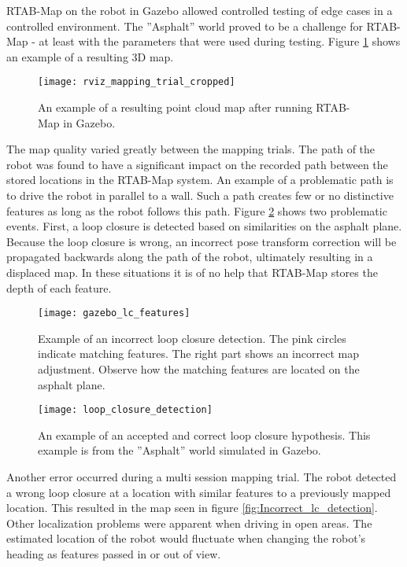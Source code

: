 \ac{RTAB-Map} on the robot in Gazebo allowed controlled testing of edge cases in a controlled environment. The ''Asphalt'' world proved to be a challenge for \ac{RTAB-Map} - at least with the parameters that were used during testing. Figure \ref{fig:rviz_mapping_trial} shows an example of a resulting 3D map. 

\begin{figure}[H]
	\centering
	\texttt{[image: rviz\_mapping\_trial\_cropped]}
	\caption{An example of a resulting point cloud map after running \ac{RTAB-Map} in Gazebo. }
	\label{fig:rviz_mapping_trial}
\end{figure}

The map quality varied greatly between the mapping trials. The path of the robot was found to have a significant impact on the recorded path between the stored locations in the \ac{RTAB-Map} system. An example of a problematic path is to drive the robot in parallel to a wall. Such a path creates few or no distinctive features as long as the robot follows this path. Figure \ref{fig:gazebo_lc_features} shows two problematic events. First, a loop closure is detected based on similarities on the asphalt plane. Because the loop closure is wrong, an incorrect pose transform correction will be propagated backwards along the path of the robot, ultimately resulting in a displaced map. In these situations it is of no help that \ac{RTAB-Map} stores the depth of each feature.

\begin{figure}[h]
	\centering
	\texttt{[image: gazebo\_lc\_features]}
	\caption{Example of an incorrect loop closure detection. The pink circles indicate matching features. The right part shows an incorrect map adjustment. Observe how the matching features are located on the asphalt plane.}
	\label{fig:gazebo_lc_features}
\end{figure}

\begin{figure}[H]
	\centering
	\texttt{[image: loop\_closure\_detection]}
	\caption{An example of an accepted and correct loop closure hypothesis. This example is from the ''Asphalt'' world simulated in Gazebo.}
	\label{fig:loop_closure_detection}
\end{figure}

Another error occurred during a multi session mapping trial. The robot detected a wrong loop closure at a location with similar features to a previously mapped location. This resulted in the map seen in figure \ref{fig:Incorrect_lc_detection}. Other localization problems were apparent when driving in open areas. The estimated location of the robot would fluctuate when changing the robot's heading as features passed in or out of view.

